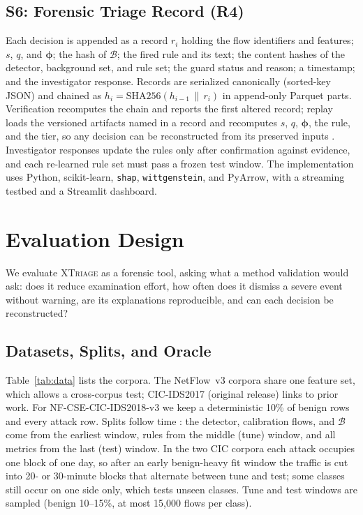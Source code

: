 \documentclass[journal]{IEEEtran}
\begin{document}
\subsection{S6: Forensic Triage Record (R4)}
Each decision is appended as a record $r_i$ holding the flow identifiers and features; $s$, $q$, and $\boldsymbol{\phi}$; the hash of $\mathcal{B}$; the fired rule and its text; the content hashes of the detector, background set, and rule set; the guard status and reason; a timestamp; and the investigator response. Records are serialized canonically (sorted-key JSON) and chained as $h_i=\mathrm{SHA256}(h_{i-1}\,\|\,r_i)$ in append-only Parquet parts. Verification recomputes the chain and reports the first altered record; replay loads the versioned artifacts named in a record and recomputes $s$, $q$, $\boldsymbol{\phi}$, the rule, and the tier, so any decision can be reconstructed from its preserved inputs \cite{nist,iso27042}. Investigator responses update the rules only after confirmation against evidence, and each re-learned rule set must pass a frozen test window. The implementation uses Python, scikit-learn, \texttt{shap}, \texttt{wittgenstein}, and PyArrow, with a streaming testbed and a Streamlit dashboard.

\section{Evaluation Design}
\label{sec:eval}
We evaluate \textsc{XTriage} as a forensic tool, asking what a method validation \cite{iso27042,daubert} would ask: does it reduce examination effort, how often does it dismiss a severe event without warning, are its explanations reproducible, and can each decision be reconstructed?

\subsection{Datasets, Splits, and Oracle}
Table~\ref{tab:data} lists the corpora. The NetFlow~v3 corpora \cite{nfv3,unsw} share one feature set, which allows a cross-corpus test; CIC-IDS2017 \cite{cicids} (original release) links to prior work. For NF-CSE-CIC-IDS2018-v3 we keep a deterministic 10\% of benign rows and every attack row. Splits follow time \cite{arp}: the detector, calibration flows, and $\mathcal{B}$ come from the earliest window, rules from the middle (tune) window, and all metrics from the last (test) window. In the two CIC corpora each attack occupies one block of one day, so after an early benign-heavy fit window the traffic is cut into 20- or 30-minute blocks that alternate between tune and test; some classes still occur on one side only, which tests unseen classes. Tune and test windows are sampled (benign 10--15\%, at most 15{,}000 flows per class).
\end{document}
